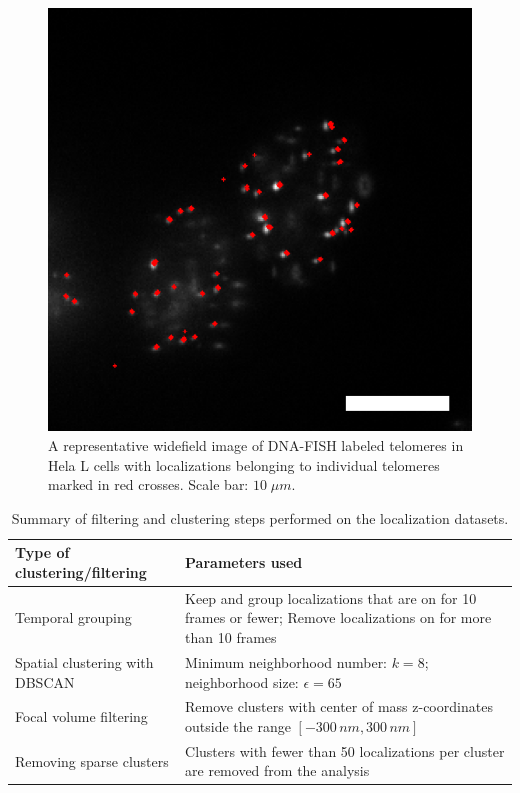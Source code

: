 \documentclass[12pt, a4paper]{article}
\begin{document}
\begin{figure}
  \centering
  \includegraphics[scale = 0.35]{fig-widefield-overlay.png}
  \caption{A representative widefield image of DNA-FISH labeled telomeres in Hela L cells with localizations belonging to individual telomeres marked in red crosses. Scale bar: $10 \; \mu m$.}
  \label{fig-widefield-overlay}
\end{figure}

\begin{table}[htb]
\centering
\begin{tabular}{|l|p{10cm}|}
\hline
\textbf{Type of clustering/filtering} & \textbf{Parameters used}\\
\hline
Temporal grouping & Keep and group localizations that are on for 10 frames or fewer; Remove localizations on for more than 10 frames\\
\hline
Spatial clustering with DBSCAN & Minimum neighborhood number: $k = 8$; neighborhood size: $\epsilon = 65$\\
\hline
Focal volume filtering & Remove clusters with center of mass z-coordinates outside the range $\left[ -300 \, nm, 300 \, nm \right]$\\
\hline
Removing sparse clusters & Clusters with fewer than 50 localizations per cluster are removed from the analysis\\
\hline
\end{tabular}\caption{Summary of filtering and clustering steps performed on the localization datasets.}

\end{table}
\end{document}
